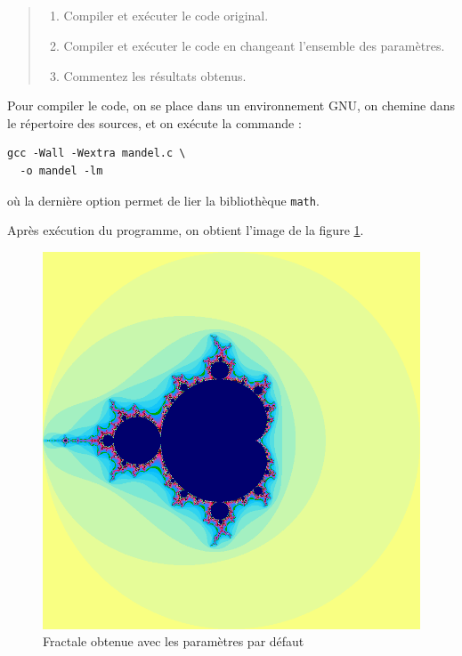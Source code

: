\subsection{}
\label{mandel:q:2}

\begin{quotation}
  \noindent
  \begin{enumerate}
  \item Compiler et exécuter le code original.
  \item Compiler et exécuter le code en changeant l'ensemble des
    paramètres.
  \item Commentez les résultats obtenus.
  \end{enumerate}
\end{quotation}

Pour compiler le code, on se place dans un environnement GNU, on
chemine dans le répertoire des sources, et on exécute la commande :

\begin{verbatim}
gcc -Wall -Wextra mandel.c \
  -o mandel -lm
\end{verbatim}

où la dernière option permet de lier la bibliothèque \texttt{math}.

Après exécution du programme, on obtient l'image de la figure
\ref{fig:default-image}.

\begin{figure}
  \centering
  \includegraphics[width=0.8\linewidth]{../Resultats/800-10000}
  \caption{Fractale obtenue avec les paramètres par défaut}
  \label{fig:default-image}
\end{figure}

